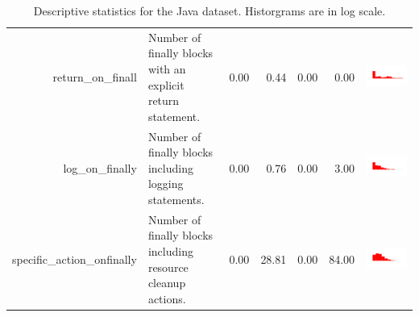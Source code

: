 \begin{table}[ht]
\begin{tabular}{rp{16em}rrrrc}
  return\_on\_finall & Number of finally blocks with an explicit return statement. & 0.00 & 0.44 & 0.00 & 0.00 & \includegraphics[scale = 0.1, clip = true, trim= 50px 60px 50px 60px]{hist-5b9c377bd3fc66fbdbd3e345bf1f1665.pdf} \\ 
  log\_on\_finally & Number of finally blocks including logging statements. & 0.00 & 0.76 & 0.00 & 3.00 & \includegraphics[scale = 0.1, clip = true, trim= 50px 60px 50px 60px]{hist-5f1e0aa338cc8aba188c8b993766730e.pdf} \\ 
  specific\_action\_onfinally & Number of finally blocks including resource cleanup actions. & 0.00 & 28.81 & 0.00 & 84.00 & \includegraphics[scale = 0.1, clip = true, trim= 50px 60px 50px 60px]{hist-b7598a0e0c1a6992089680d29db9c202.pdf} \\ 
   \hline
\end{tabular}
\caption{Descriptive statistics for the Java dataset. Historgrams are in log scale.} 
\label{tab:java-descr-stats}
\end{table}
